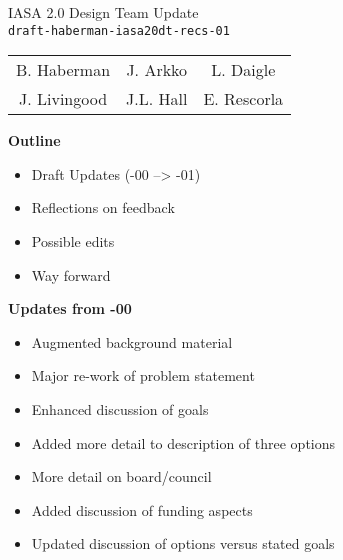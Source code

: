 \documentclass[helvetica]{seminar}
\newcommand{\heading}[1]{%
  \begin{center} 
    \large\bf 
    #1 
  \end{center} 
  \vspace{.4 in}}
\begin{document}
\begin{slide}
\begin{center}
\vspace{.5 in}
\LARGE{{\bf}IASA 2.0 Design Team Update\\{\small \verb^draft-haberman-iasa20dt-recs-01^}}\\
\vspace{.2in}
\large{
\begin{tabular}{ c c c }
B. Haberman & J. Arkko & L. Daigle \\
J. Livingood & J.L. Hall & E. Rescorla 
\end{tabular}
}
\end{center}
\end{slide}

\centerslidesfalse 

\begin{slide}
\heading{Outline}

\begin{itemize}
\item Draft Updates (-00 --> -01)
\item Reflections on feedback
\item Possible edits
\item Way forward
\end{itemize}

\end{slide}

\begin{slide}

\heading{Updates from -00}

{\footnotesize
\begin{itemize}
\item Augmented background material
\item Major re-work of problem statement
\item Enhanced discussion of goals
\item Added more detail to description of three options
\item More detail on board/council
\item Added discussion of funding aspects
\item Updated discussion of options versus stated goals
\end{itemize}
}

\end{slide}
\end{document}
